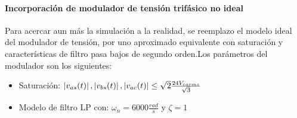 \documentclass[a4paper, 10pt, onecolumn,journal]{ieeeconf}
\begin{document}
\paragraph{\textbf{Incorporación de modulador de tensión trifásico no ideal}} Para acercar aun más la simulación a la realidad, se reemplazo el modelo ideal del modulador de tensión, por uno aproximado equivalente con saturación y características de filtro pasa bajos de segundo orden.Los parámetros del modulador son los siguientes:
\begin{itemize}
	\item Saturación: $\left| v_{as}(t)\right|,\left| v_{bs}(t)\right|,\left| v_{ac}(t)\right| \leq \sqrt{2} \frac{24 V_{ca \space rms}}{\sqrt{3}} $
	\item Modelo de filtro LP con: $\omega_n = 6000 \frac{rad}{s} $ y $\zeta = 1$ 
\end{itemize}
\end{document}
